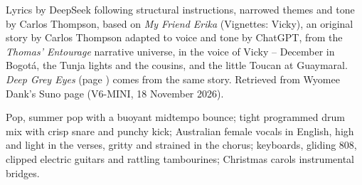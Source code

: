 
\label{sec:christmas-lights-and-toucan-flights}
\begin{notes}
Lyrics by DeepSeek following structural instructions, narrowed themes and tone by Carlos Thompson, based on \emph{My Friend Erika} (Vignettes: Vicky), an original story by Carlos Thompson adapted to voice and tone by ChatGPT, from the \emph{Thomas' Entourage} narrative universe, in the voice of Vicky -- December in Bogotá, the Tunja lights and the cousins, and the little Toucan at Guaymaral. \emph{Deep Grey Eyes} (page \pageref{sec:deep-grey-eyes}) comes from the same story. Retrieved from Wyomee Dank's Suno page (V6-MINI, 18 November 2026).
\end{notes}
\begin{style}
Pop, summer pop with a buoyant midtempo bounce; tight programmed drum mix with crisp snare and punchy kick; Australian female vocals in English, high and light in the verses, gritty and strained in the chorus; keyboards, gliding 808, clipped electric guitars and rattling tambourines; Christmas carols instrumental bridges.
\end{style}
